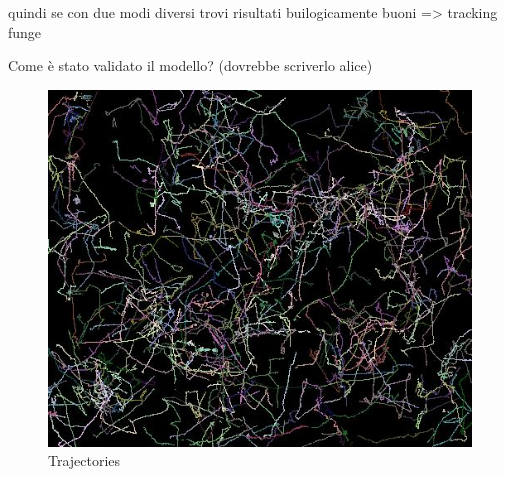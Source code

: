 \documentclass[conference]{IEEEtran}
\begin{document}
quindi se con due modi diversi trovi risultati builogicamente buoni => tracking funge




Come è stato validato il modello? (dovrebbe scriverlo alice)

    \begin{figure}
      \begin{center}
        \includegraphics[scale=0.5]{./images/result.png}
        \caption{Trajectories}
        \label{fig:}
      \end{center}
    \end{figure}






%
\end{document}
